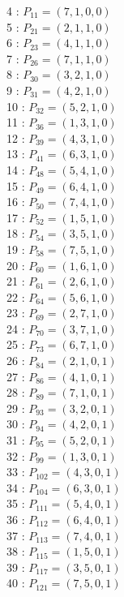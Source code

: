 \documentclass{article}
\begin{document}
{\begin{multicols}{3}
4 : $P_{11}=( 7, 1, 0, 0 )$\\
5 : $P_{21}=( 2, 1, 1, 0 )$\\
6 : $P_{23}=( 4, 1, 1, 0 )$\\
7 : $P_{26}=( 7, 1, 1, 0 )$\\
8 : $P_{30}=( 3, 2, 1, 0 )$\\
9 : $P_{31}=( 4, 2, 1, 0 )$\\
10 : $P_{32}=( 5, 2, 1, 0 )$\\
11 : $P_{36}=( 1, 3, 1, 0 )$\\
12 : $P_{39}=( 4, 3, 1, 0 )$\\
13 : $P_{41}=( 6, 3, 1, 0 )$\\
14 : $P_{48}=( 5, 4, 1, 0 )$\\
15 : $P_{49}=( 6, 4, 1, 0 )$\\
16 : $P_{50}=( 7, 4, 1, 0 )$\\
17 : $P_{52}=( 1, 5, 1, 0 )$\\
18 : $P_{54}=( 3, 5, 1, 0 )$\\
19 : $P_{58}=( 7, 5, 1, 0 )$\\
20 : $P_{60}=( 1, 6, 1, 0 )$\\
21 : $P_{61}=( 2, 6, 1, 0 )$\\
22 : $P_{64}=( 5, 6, 1, 0 )$\\
23 : $P_{69}=( 2, 7, 1, 0 )$\\
24 : $P_{70}=( 3, 7, 1, 0 )$\\
25 : $P_{73}=( 6, 7, 1, 0 )$\\
26 : $P_{84}=( 2, 1, 0, 1 )$\\
27 : $P_{86}=( 4, 1, 0, 1 )$\\
28 : $P_{89}=( 7, 1, 0, 1 )$\\
29 : $P_{93}=( 3, 2, 0, 1 )$\\
30 : $P_{94}=( 4, 2, 0, 1 )$\\
31 : $P_{95}=( 5, 2, 0, 1 )$\\
32 : $P_{99}=( 1, 3, 0, 1 )$\\
33 : $P_{102}=( 4, 3, 0, 1 )$\\
34 : $P_{104}=( 6, 3, 0, 1 )$\\
35 : $P_{111}=( 5, 4, 0, 1 )$\\
36 : $P_{112}=( 6, 4, 0, 1 )$\\
37 : $P_{113}=( 7, 4, 0, 1 )$\\
38 : $P_{115}=( 1, 5, 0, 1 )$\\
39 : $P_{117}=( 3, 5, 0, 1 )$\\
40 : $P_{121}=( 7, 5, 0, 1 )$\\

\end{multicols}}
\end{document}
